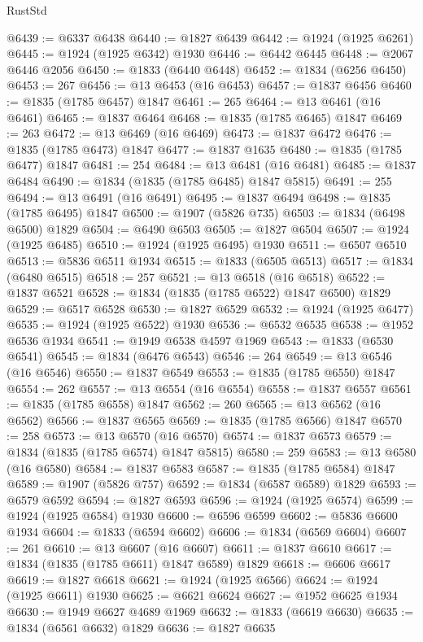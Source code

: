 \begin{lexlean}{RustStd}
\begin{coremodule}
@6439 := @6337 @6438
@6440 := @1827 @6439
@6442 := @1924 (@1925 @6261)
@6445 := @1924 (@1925 @6342) @1930
@6446 := @6442 @6445
@6448 := @2067 @6446 @2056
@6450 := @1833 (@6440 @6448)
@6452 := @1834 (@6256 @6450)
@6453 := 267
@6456 := @13 @6453 (@16 @6453)
@6457 := @1837 @6456
@6460 := @1835 (@1785 @6457) @1847
@6461 := 265
@6464 := @13 @6461 (@16 @6461)
@6465 := @1837 @6464
@6468 := @1835 (@1785 @6465) @1847
@6469 := 263
@6472 := @13 @6469 (@16 @6469)
@6473 := @1837 @6472
@6476 := @1835 (@1785 @6473) @1847
@6477 := @1837 @1635
@6480 := @1835 (@1785 @6477) @1847
@6481 := 254
@6484 := @13 @6481 (@16 @6481)
@6485 := @1837 @6484
@6490 := @1834 (@1835 (@1785 @6485) @1847 @5815)
@6491 := 255
@6494 := @13 @6491 (@16 @6491)
@6495 := @1837 @6494
@6498 := @1835 (@1785 @6495) @1847
@6500 := @1907 (@5826 @735)
@6503 := @1834 (@6498 @6500) @1829
@6504 := @6490 @6503
@6505 := @1827 @6504
@6507 := @1924 (@1925 @6485)
@6510 := @1924 (@1925 @6495) @1930
@6511 := @6507 @6510
@6513 := @5836 @6511 @1934
@6515 := @1833 (@6505 @6513)
@6517 := @1834 (@6480 @6515)
@6518 := 257
@6521 := @13 @6518 (@16 @6518)
@6522 := @1837 @6521
@6528 := @1834 (@1835 (@1785 @6522) @1847 @6500) @1829
@6529 := @6517 @6528
@6530 := @1827 @6529
@6532 := @1924 (@1925 @6477)
@6535 := @1924 (@1925 @6522) @1930
@6536 := @6532 @6535
@6538 := @1952 @6536 @1934
@6541 := @1949 @6538 @4597 @1969
@6543 := @1833 (@6530 @6541)
@6545 := @1834 (@6476 @6543)
@6546 := 264
@6549 := @13 @6546 (@16 @6546)
@6550 := @1837 @6549
@6553 := @1835 (@1785 @6550) @1847
@6554 := 262
@6557 := @13 @6554 (@16 @6554)
@6558 := @1837 @6557
@6561 := @1835 (@1785 @6558) @1847
@6562 := 260
@6565 := @13 @6562 (@16 @6562)
@6566 := @1837 @6565
@6569 := @1835 (@1785 @6566) @1847
@6570 := 258
@6573 := @13 @6570 (@16 @6570)
@6574 := @1837 @6573
@6579 := @1834 (@1835 (@1785 @6574) @1847 @5815)
@6580 := 259
@6583 := @13 @6580 (@16 @6580)
@6584 := @1837 @6583
@6587 := @1835 (@1785 @6584) @1847
@6589 := @1907 (@5826 @757)
@6592 := @1834 (@6587 @6589) @1829
@6593 := @6579 @6592
@6594 := @1827 @6593
@6596 := @1924 (@1925 @6574)
@6599 := @1924 (@1925 @6584) @1930
@6600 := @6596 @6599
@6602 := @5836 @6600 @1934
@6604 := @1833 (@6594 @6602)
@6606 := @1834 (@6569 @6604)
@6607 := 261
@6610 := @13 @6607 (@16 @6607)
@6611 := @1837 @6610
@6617 := @1834 (@1835 (@1785 @6611) @1847 @6589) @1829
@6618 := @6606 @6617
@6619 := @1827 @6618
@6621 := @1924 (@1925 @6566)
@6624 := @1924 (@1925 @6611) @1930
@6625 := @6621 @6624
@6627 := @1952 @6625 @1934
@6630 := @1949 @6627 @4689 @1969
@6632 := @1833 (@6619 @6630)
@6635 := @1834 (@6561 @6632) @1829
@6636 := @1827 @6635

\end{coremodule}
\end{lexlean}
